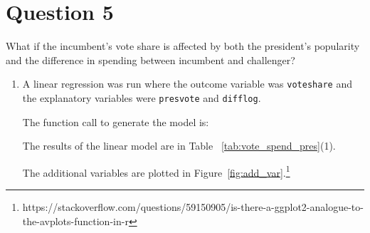 \documentclass[12pt,letterpaper]{article}
\begin{document}
\section*{Question 5}
\noindent What if the incumbent's vote share is affected by both the president's popularity and the difference in spending between incumbent and challenger? 
	\begin{enumerate}
		\item A linear regression was run where the outcome variable was \texttt{voteshare} and 
		the explanatory variables were \texttt{presvote} and \texttt{difflog}.	
		
      The function call to generate the model is:
	    

	    The results of the linear model are in Table ~\ref{tab:vote_spend_pres}(1).

      The additional variables are plotted in Figure~\ref{fig:add_var}.\footnote{https://stackoverflow.com/questions/59150905/is-there-a-ggplot2-analogue-to-the-avplots-function-in-r}

\end{enumerate}
\end{document}

